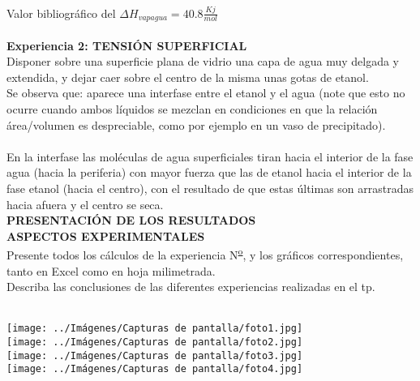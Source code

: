 \documentclass[10pt,a4paper]{article}
\begin{document}
\\ \medskip Valor bibliográfico del   $ \Delta H_{vap agua}= 40.8 \frac{Kj}{mol} $ \\
 
 \\ \medskip
\textbf{Experiencia 2: TENSIÓN SUPERFICIAL } \\ 
  
Disponer sobre una superficie plana de vidrio una capa de agua muy delgada y extendida, y dejar caer sobre el centro de la misma unas gotas de etanol. \\
Se observa que: aparece una interfase entre el etanol y el agua (note que esto no ocurre cuando ambos líquidos se mezclan en condiciones en que la relación área/volumen es despreciable, como por ejemplo en un vaso de precipitado). \\ \\  
En la interfase las moléculas de agua superficiales tiran hacia el interior de la fase agua (hacia la periferia) con mayor fuerza que las de etanol hacia el interior de la fase etanol (hacia el centro), con el resultado de que estas últimas son arrastradas hacia afuera y el centro se seca. \\
 
\textbf{PRESENTACIÓN DE LOS RESULTADOS} \\
 
 
\textbf{ASPECTOS EXPERIMENTALES } \\

Presente todos los cálculos de la experiencia N\textsuperscript{\underline{o}}, y los gráficos correspondientes, tanto en Excel como en hoja milimetrada. \\

Describa las conclusiones de las diferentes experiencias realizadas en el tp. \\ \\

 \begin{center}
 

 \texttt{[image: ../Imágenes/Capturas de pantalla/foto1.jpg]} \\
 \texttt{[image: ../Imágenes/Capturas de pantalla/foto2.jpg]}\\ 
 \texttt{[image: ../Imágenes/Capturas de pantalla/foto3.jpg]}\\ 
 \texttt{[image: ../Imágenes/Capturas de pantalla/foto4.jpg]}\\ 
 \end{center}
 
\end{document}
